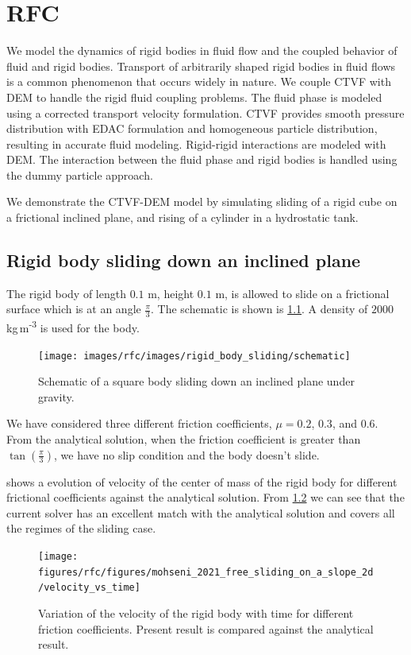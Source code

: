 \FloatBarrier%
\chapter{RFC}
\label{chap:rfc}
We model the dynamics of rigid bodies in fluid flow and the coupled behavior of
fluid and rigid bodies. Transport of arbitrarily shaped rigid bodies in fluid
flows is a common phenomenon that occurs widely in nature. We couple CTVF with
DEM to handle the rigid fluid coupling problems. The fluid phase is modeled
using a corrected transport velocity formulation. CTVF provides smooth pressure
distribution with EDAC formulation and homogeneous particle distribution,
resulting in accurate fluid modeling. Rigid-rigid interactions are modeled with
DEM. The interaction between the fluid phase and rigid bodies is handled using
the dummy particle approach.

We demonstrate the CTVF-DEM model by simulating sliding of a rigid cube on a
frictional inclined plane, and rising of a cylinder in a
hydrostatic tank.


\FloatBarrier%
\section{Rigid body sliding down an inclined plane}
\label{sec:rigid-body-sliding}
The rigid body of length $0.1$ m, height
$0.1$ m, is allowed to slide on a frictional surface which is at an angle
$\frac{\pi}{3}$. The schematic is shown is \cref{fig:rigid_body_sliding}. A
density of $2000$ kg\,m\textsuperscript{-3} is used for the body.
\begin{figure}[!htpb]
  \centering
  \texttt{[image: images/rfc/images/rigid\_body\_sliding/schematic]}
  \caption{Schematic of a square body sliding down an inclined plane under gravity.}
\label{fig:rigid_body_sliding}
\end{figure}
We have considered three different friction coefficients, $\mu=0.2$, $0.3$, and
$0.6$. From the analytical solution, when the friction coefficient is greater
than $\tan(\frac{\pi}{3})$, we have no slip condition and the body doesn't
slide.

 shows a evolution of
velocity of the center of mass of the rigid body for different frictional
coefficients against the analytical solution. From
\cref{fig:results-solid-sliding-velocity-vs-time-2d} we can see that the current
solver has an excellent match with the analytical solution and covers all the
regimes of the sliding case.
\begin{figure}[!htpb]
  \centering
  \texttt{[image: figures/rfc/figures/mohseni\_2021\_free\_sliding\_on\_a\_slope\_2d/velocity\_vs\_time]}
  \caption{Variation of the velocity of the rigid body with time for different
    friction coefficients. Present result is compared against the analytical
    result.}
\label{fig:results-solid-sliding-velocity-vs-time-2d}
\end{figure}


